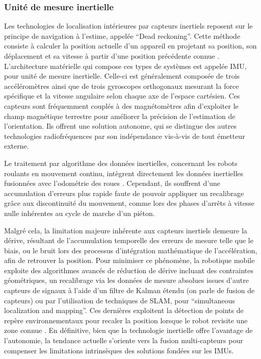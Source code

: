 \documentclass[11pt, a4paper]{article}
\begin{document}
\subsubsection{Unité de mesure inertielle}

Les technologies de localisation intérieures par capteurs inertiels reposent sur le principe de navigation à l’estime, appelée “Dead reckoning”. Cette méthode consiste à calculer la position actuelle d’un appareil en projetant sa position, son déplacement et sa vitesse à partir d’une position précédente connue \cite{samatasInertialMeasurementUnits2022}. L’architecture matérielle qui compose ces types de systèmes est appelée IMU, pour unité de mesure inertielle. Celle-ci est généralement composée de trois accéléromètres ainsi que de trois gyroscopes orthogonaux mesurant la force spécifique et la vitesse angulaire selon chaque axe de l’espace cartésien. Ces capteurs sont fréquemment couplés à des magnétomètres afin d’exploiter le champ magnétique terrestre pour améliorer la précision de l’estimation de l’orientation. Ils offrent une solution autonome, qui se distingue des autres technologies radiofréquences par son indépendance vis-à-vis de tout émetteur externe.

Le traitement par algorithme des données inertielles, concernant les robots roulants en mouvement continu, intègrent directement les données inertielles fusionnées avec l'odométrie des roues \cite{samatasInertialMeasurementUnits2022}. Cependant, ils souffrent d'une accumulation d'erreurs plus rapide faute de pouvoir appliquer un recalibrage grâce aux discontinuité du mouvement, comme lors des phases d’arrêts à vitesse nulle inhérentes au cycle de marche d’un piéton.

Malgré cela, la limitation majeure inhérente aux capteurs inertiels demeure la dérive, résultant de l’accumulation temporelle des erreurs de mesure telle que le biais, ou le bruit lors des processus d’intégration mathématique de l’accélération, afin de retrouver la position. Pour minimiser ce phénomène, la robotique mobile exploite des algorithmes avancés de réduction de dérive incluant des contraintes géométriques, un recalibrage via les données de mesure absolues issues d’autre capteurs de signaux à l’aide d’un filtre de Kalman étendu (on parle de fusion de capteurs) ou par l'utilisation de techniques de SLAM, pour  “simultaneous localization and mapping”. Ces dernières exploitent la détection de points de repère environnementaux pour recaler la position lorsque le robot revisite une zone connue \cite{barshanInertialNavigationSystems, diazSection9Review}. En définitive, bien que la technologie inertielle offre l'avantage de l'autonomie, la tendance actuelle s'oriente vers la fusion multi-capteurs pour compenser les limitations intrinsèques des solutions fondées sur les IMUs. 
\end{document}
